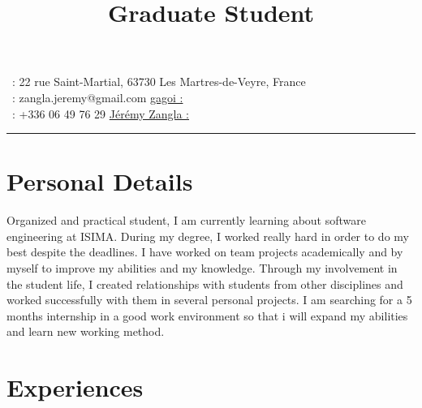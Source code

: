 \documentclass[11pt, a4paper, sans]{moderncv}
\title{Graduate Student}
\begin{document}
\makecvtitle
\vspace*{-1cm}
\footnotesize
\faHome~: 22 rue Saint-Martial, 63730 Les Martres-de-Veyre, France \\
\faEnvelopeSquare~: zangla.jeremy@gmail.com \hfill \href{https://github.com/gagoi}{gagoi : \faGithubSquare} \\
\faPhoneSquare~: +336 06 49 76 29 \hfill \href{https://www.linkedin.com/in/j\%C3\%A9r\%C3\%A9my-zangla-a18336137/}{Jérémy Zangla : \faLinkedinSquare}
\normalsize
\rule{17cm}{0.1pt}

\section{Personal Details}
Organized and practical student, I am currently learning about software engineering at ISIMA. During my degree, I worked really hard in order to do my best despite the deadlines. I have worked on team projects academically and by myself to improve my abilities and my knowledge. Through my involvement in the student life, I created relationships with students from other disciplines and worked successfully with them in several personal projects. I am searching for a 5 months internship in a good work environment so that i will expand my abilities and learn new working method.

\section{Experiences}
\end{document}
